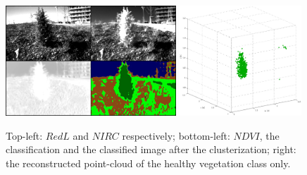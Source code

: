 \documentclass[a4paper, 10pt, conference]{ieeeconf}      %
\begin{document}
\begin{figure}[t!]
      \centering
      \includegraphics[width=0.57\textwidth]{../images/frame_2.jpg}
      \includegraphics[width=0.41\textwidth]{../images/frame_2pc.jpg}
      \caption{Top-left: $RedL$ and $NIRC$ respectively; bottom-left: $NDVI$, the classification and the classified image after the clusterization; right: the reconstructed point-cloud of the healthy vegetation class only.}
       \label{fig:frame2}
\end{figure}
\end{document}
